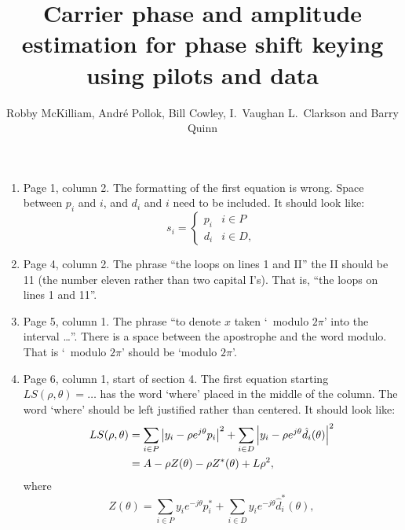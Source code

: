\documentclass[a4paper,10pt]{article}
\title{Carrier phase and amplitude estimation for phase shift keying using pilots and data}
\author{Robby McKilliam, Andr\'{e} Pollok, Bill Cowley, I.\ Vaughan L.\ Clarkson and Barry Quinn  
}
\begin{document}

\begin{enumerate}
\item Page 1, column 2.  The formatting of the first equation is wrong.  Space between $p_i$ and $i$, and $d_i$ and $i$ need to be included.  It should look like:
\[
s_i = \begin{cases}
p_i & i \in P \\
d_i & i \in D,
\end{cases}
\]


\item Page 4, column 2.  The phrase ``the loops on lines 1 and II'' the II should be 11 (the number eleven rather than two capital I's).  That is, ``the loops on lines 1 and 11''.

\item Page 5, column 1.  The phrase ``to denote $x$ taken `~modulo $2\pi$' into the interval \dots''.  There is a space between the apostrophe and the word modulo.  That is `~modulo $2\pi$' should be `modulo $2\pi$'. 

\item \label{com:leftjustwhere} Page 6, column 1, start of section 4.  The first equation starting $LS(\rho, \theta) = \dots$ has the word `where' placed in the middle of the column.  The word `where' should be left justified rather than centered.  It should look like:
 \begin{align*}
LS(\rho, \theta) &=\sum_{i \in P} {\left\vert  y_i - \rho e^{j\theta} p_i  \right\vert}^2 + \sum_{i \in D} {\left\vert  y_i - \rho e^{j\theta} \hat{d_i}(\theta)  \right\vert}^2 \\
&= A - \rho Z(\theta) - \rho Z^*(\theta) + L \rho^2,
\end{align*}
where
\[
Z(\theta)  = \sum_{i \in P} y_i e^{-j\theta} p_i^* + \sum_{i \in D} y_i e^{-j\theta} \hat{d}_i^*(\theta),
\]


\end{enumerate}
\end{document}
